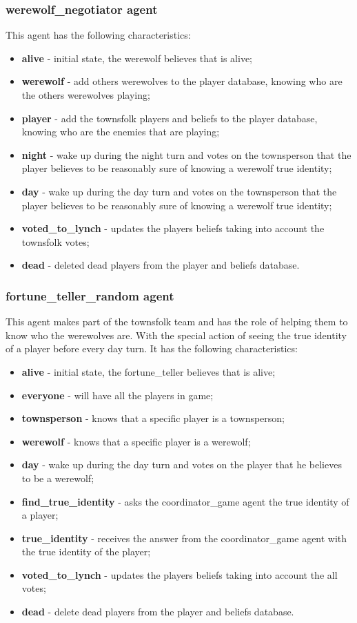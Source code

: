 \documentclass{article}
\begin{document}
\subsubsection{werewolf\_negotiator agent}
This agent has the following characteristics:
\begin{itemize}
	\item \textbf{alive} - initial state, the werewolf believes that is alive;
	\item \textbf{werewolf} - add others werewolves to the player database, knowing who are the others werewolves playing;
	\item \textbf{player} - add the townsfolk players and beliefs to the player database, knowing who are the enemies that are playing;
	\item \textbf{night} - wake up during the night turn and votes on the townsperson that the player believes to be reasonably sure of knowing a werewolf true identity;
	\item \textbf{day} - wake up during the day turn and votes on the townsperson that the player believes to be reasonably sure of knowing a werewolf true identity;
	\item \textbf{voted\_to\_lynch} - updates the players beliefs taking into account the townsfolk votes;
	\item \textbf{dead} - deleted dead players from the player and beliefs database.
\end{itemize}

\subsubsection{fortune\_teller\_random agent}
This agent makes part of the townsfolk team and has the role of helping them to know who the werewolves are. With the special action of seeing the true identity of a player before every day turn.
It has the following characteristics:
\begin{itemize}
	\item \textbf{alive} - initial state, the fortune\_teller believes that is alive;
	\item \textbf{everyone} - will have all the players in game;
	\item \textbf{townsperson} - knows that a specific player is a townsperson;
	\item \textbf{werewolf} - knows that a specific player is a werewolf;
	\item \textbf{day} - wake up during the day turn and votes on the player that he believes to be a werewolf;
	\item \textbf{find\_true\_identity} - asks the coordinator\_game agent the true identity of a player;
	\item \textbf{true\_identity} - receives the answer from the coordinator\_game agent with the true identity of the player;
	\item \textbf{voted\_to\_lynch} - updates the players beliefs taking into account the all votes;
	\item \textbf{dead} - delete dead players from the player and beliefs database.
\end{itemize}
\end{document}
